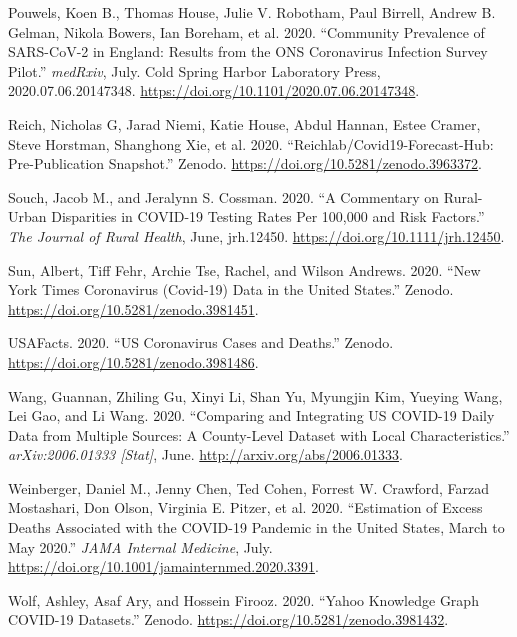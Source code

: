 \documentclass[10pt,letterpaper]{article}
\begin{document}
\leavevmode\hypertarget{ref-pouwelsCommunityPrevalenceSARSCoV22020}{}%
Pouwels, Koen B., Thomas House, Julie V. Robotham, Paul Birrell, Andrew
B. Gelman, Nikola Bowers, Ian Boreham, et al. 2020. ``Community
Prevalence of SARS-CoV-2 in England: Results from the ONS Coronavirus
Infection Survey Pilot.'' \emph{medRxiv}, July. Cold Spring Harbor
Laboratory Press, 2020.07.06.20147348.
\url{https://doi.org/10.1101/2020.07.06.20147348}.

\leavevmode\hypertarget{ref-nicholasgreichReichlabCovid19forecasthubPrepublication2020}{}%
Reich, Nicholas G, Jarad Niemi, Katie House, Abdul Hannan, Estee Cramer,
Steve Horstman, Shanghong Xie, et al. 2020.
``Reichlab/Covid19-Forecast-Hub: Pre-Publication Snapshot.'' Zenodo.
\url{https://doi.org/10.5281/zenodo.3963372}.

\leavevmode\hypertarget{ref-souchCommentaryRuralUrban2020}{}%
Souch, Jacob M., and Jeralynn S. Cossman. 2020. ``A Commentary on
Rural-Urban Disparities in COVID-19 Testing Rates Per 100,000 and Risk
Factors.'' \emph{The Journal of Rural Health}, June, jrh.12450.
\url{https://doi.org/10.1111/jrh.12450}.

\leavevmode\hypertarget{ref-albertsunNewYorkTimes2020}{}%
Sun, Albert, Tiff Fehr, Archie Tse, Rachel, and Wilson Andrews. 2020.
``New York Times Coronavirus (Covid-19) Data in the United States.''
Zenodo. \url{https://doi.org/10.5281/zenodo.3981451}.

\leavevmode\hypertarget{ref-usafactsUSCoronavirusCases2020}{}%
USAFacts. 2020. ``US Coronavirus Cases and Deaths.'' Zenodo.
\url{https://doi.org/10.5281/zenodo.3981486}.

\leavevmode\hypertarget{ref-wangComparingIntegratingUS2020}{}%
Wang, Guannan, Zhiling Gu, Xinyi Li, Shan Yu, Myungjin Kim, Yueying
Wang, Lei Gao, and Li Wang. 2020. ``Comparing and Integrating US
COVID-19 Daily Data from Multiple Sources: A County-Level Dataset with
Local Characteristics.'' \emph{arXiv:2006.01333 {[}Stat{]}}, June.
\url{http://arxiv.org/abs/2006.01333}.

\leavevmode\hypertarget{ref-weinbergerEstimationExcessDeaths2020}{}%
Weinberger, Daniel M., Jenny Chen, Ted Cohen, Forrest W. Crawford,
Farzad Mostashari, Don Olson, Virginia E. Pitzer, et al. 2020.
``Estimation of Excess Deaths Associated with the COVID-19 Pandemic in
the United States, March to May 2020.'' \emph{JAMA Internal Medicine},
July. \url{https://doi.org/10.1001/jamainternmed.2020.3391}.

\leavevmode\hypertarget{ref-ashleywolfYahooKnowledgeGraph2020}{}%
Wolf, Ashley, Asaf Ary, and Hossein Firooz. 2020. ``Yahoo Knowledge
Graph COVID-19 Datasets.'' Zenodo.
\url{https://doi.org/10.5281/zenodo.3981432}.
\end{document}
